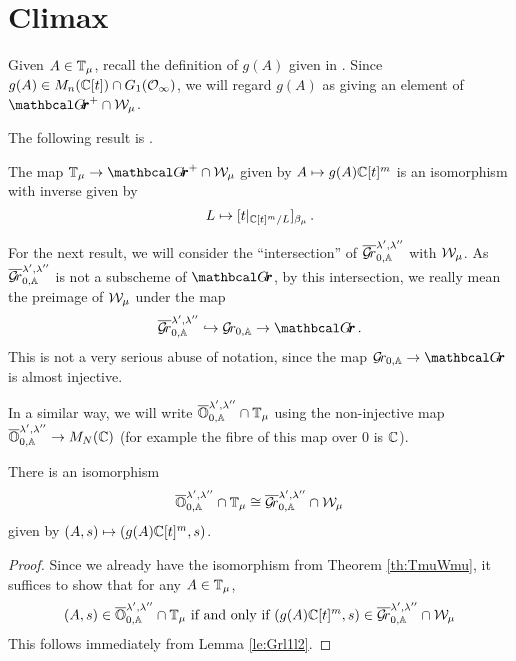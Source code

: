 \documentclass[draft]{article}
\begin{document}
\section{Climax}
Given $ A \in \mathbb T_\mu$, recall the definition of $ g(A)$ given in .
Since $ g(A) \in M_n(\mathbb C[t]) \cap G_1(\mathcal O_\infty)$, we will regard $ g(A)$ as giving an element of $ \Grth^+ \cap \cW_\mu$.

The following result is \cite[Theorem 3.2]{cautis2018categorical}.

\begin{theorem} \label{th:TmuWmu}
The map $ \TT_\mu \rightarrow \Grth^+ \cap \cW_\mu $ given by $ A \mapsto g(A)\mathbb C[t]^m $ is an isomorphism with inverse given by
$$ L \mapsto [t|_{\mathbb C[t]^m/L} ]_{\beta_\mu} \,. $$
\end{theorem}


For the next result, we will consider the ``intersection'' of $ \overline{\mathcal{G}\!r}^{\lambda', \lambda''}_{0,\mathbb A} $ with $\mathcal W_\mu$.  
As $  \overline{\mathcal{G}\!r}^{\lambda', \lambda''}_{0,\mathbb A} $ is not a subscheme of $ \Grth$, by this intersection, we really mean the preimage of $ \mathcal W_\mu$ under the map 
$$ 
\overline{\Gr}^{\lambda', \lambda''}_{0,\AA}  \hookrightarrow \Grbd \rightarrow \Grth\,.
$$
This is not a very serious abuse of notation, since the map $ \Grbd \rightarrow \Grth $ is almost injective. 

In a similar way, we will write $ \overline{\mathbb O}^{\lambda', \lambda''}_{0,\mathbb A} \cap \mathbb T_\mu$ using the non-injective map $ \overline{\mathbb O}^{\lambda', \lambda''}_{0,\mathbb A} \rightarrow M_N(\mathbb C)$ (for example the fibre of this map over $ 0 $ is $ \mathbb C $). 

\begin{theorem} \label{th:OGrl}
    There is an isomorphism
    $$\overline{\mathbb O}^{\lambda', \lambda''}_{0,\mathbb A} \cap \mathbb T_\mu \cong \overline{\mathcal{G}\!r}^{\lambda', \lambda''}_{0,\mathbb A} \cap \mathcal W_\mu $$
    given by $ (A,s) \mapsto (g(A)\mathbb C[t]^m, s)$.
\end{theorem}
\begin{proof}
Since we already have the isomorphism from Theorem \ref{th:TmuWmu}, it suffices to show that for any $ A \in \mathbb T_\mu$, $$ (A,s) \in \overline{\mathbb O}^{\lambda', \lambda''}_{0,\mathbb A} \cap \mathbb T_\mu \text{ if and only if } (g(A)\mathbb C[t]^m, s) \in \overline{\mathcal{G}\!r}^{\lambda', \lambda''}_{0,\mathbb A} \cap \mathcal W_\mu $$
This follows immediately from Lemma \ref{le:Grl1l2}.
\end{proof}
\end{document}
